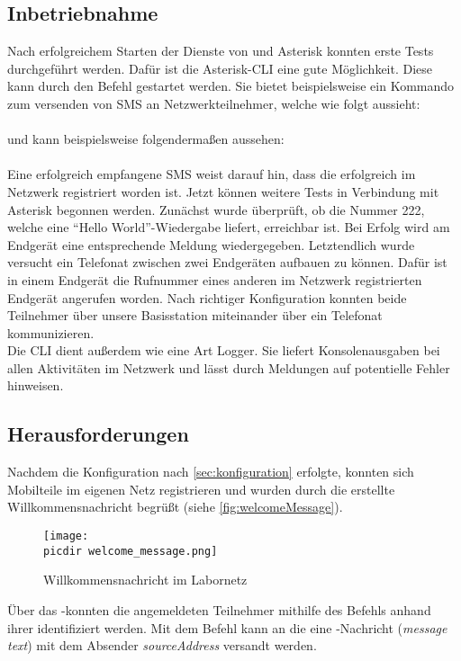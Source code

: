 \subsection{Inbetriebnahme}
\label{sec:inbetriebnahme}
Nach erfolgreichem Starten der Dienste von \OpenBTS und Asterisk konnten erste Tests durchgeführt werden. Dafür ist die Asterisk-CLI eine gute Möglichkeit. Diese kann durch den Befehl  gestartet werden. Sie bietet beispielsweise ein Kommando zum versenden von SMS an Netzwerkteilnehmer, welche wie folgt aussieht:\\
\\
und kann beispielsweise folgendermaßen aussehen:\\
\\
Eine erfolgreich empfangene SMS weist darauf hin, dass die \IMSI erfolgreich im Netzwerk registriert worden ist. Jetzt können weitere Tests in Verbindung mit Asterisk begonnen werden. Zunächst wurde überprüft, ob die Nummer 222, welche eine ``Hello World''-Wiedergabe liefert, erreichbar ist. Bei Erfolg wird am Endgerät eine entsprechende Meldung wiedergegeben. Letztendlich wurde versucht ein Telefonat zwischen zwei Endgeräten aufbauen zu können. Dafür ist in einem Endgerät die Rufnummer eines anderen im Netzwerk registrierten Endgerät angerufen worden. Nach richtiger Konfiguration konnten beide Teilnehmer über unsere Basisstation miteinander über ein Telefonat kommunizieren. \\
Die CLI dient außerdem wie eine Art Logger. Sie liefert Konsolenausgaben bei allen Aktivitäten im Netzwerk und lässt durch Meldungen auf potentielle Fehler hinweisen. 

\subsection{Herausforderungen}
\label{sec:herausforderung}
Nachdem die Konfiguration nach \autoref{sec:konfiguration} erfolgte, konnten sich Mobilteile im eigenen Netz registrieren und wurden durch die erstellte Willkommensnachricht begrüßt (siehe \autoref{fig:welcomeMessage}).

\begin{figure}[h!]
	\centering
	\texttt{[image: \\picdir welcome\_message.png]}
	\caption{Willkommensnachricht im Labornetz}
	\label{fig:welcomeMessage}
	
\end{figure}
Über das \OpenBTS-\CLI konnten die angemeldeten Teilnehmer mithilfe des Befehls  anhand ihrer \IMSI identifiziert werden. Mit dem Befehl  kann an die \emph{\IMSI} eine \SMS-Nachricht (\emph{message text}) mit dem Absender \emph{sourceAddress} versandt werden.

